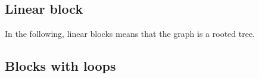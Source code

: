 
\subsection{Linear block}

In the following, linear blocks means that the graph is a rooted tree.

\subsection{Blocks with loops}

